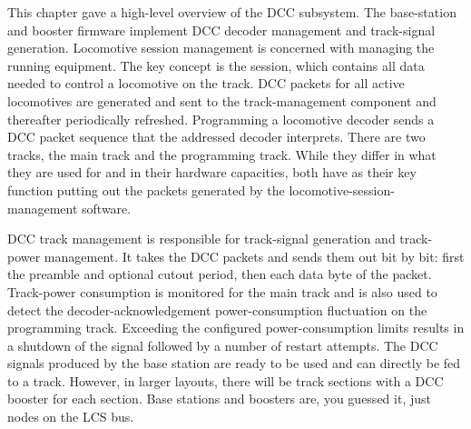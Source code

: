 
This chapter gave a high-level overview of the DCC subsystem. The base-station and booster firmware implement DCC decoder management and track-signal generation. Locomotive session management is concerned with managing the running equipment. The key concept is the session, which contains all data needed to control a locomotive on the track. DCC packets for all active locomotives are generated and sent to the track-management component and thereafter periodically refreshed. Programming a locomotive decoder sends a DCC packet sequence that the addressed decoder interprets. There are two tracks, the main track and the programming track. While they differ in what they are used for and in their hardware capacities, both have as their key function putting out the packets generated by the locomotive-session-management software.

DCC track management is responsible for track-signal generation and track-power management. It takes the DCC packets and sends them out bit by bit: first the preamble and optional cutout period, then each data byte of the packet. Track-power consumption is monitored for the main track and is also used to detect the decoder-acknowledgement power-consumption fluctuation on the programming track. Exceeding the configured power-consumption limits results in a shutdown of the signal followed by a number of restart attempts. The DCC signals produced by the base station are ready to be used and can directly be fed to a track. However, in larger layouts, there will be track sections with a DCC booster for each section. Base stations and boosters are, you guessed it, just nodes on the LCS bus.

